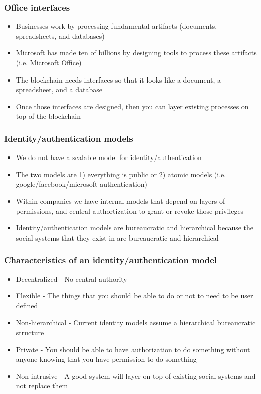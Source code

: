 \documentclass{beamer}
\begin{document}
\begin{frame}
  \frametitle{Office interfaces}
  \begin{itemize}
    \item Businesses work by processing fundamental artifacts
      (documents, spreadsheets, and databases)
    \item Microsoft has made ten of billions by designing tools to
      process these artifacts (i.e. Microsoft Office)
    \item The blockchain needs interfaces so that it looks like a
      document, a spreadsheet, and a database
    \item Once those interfaces are designed, then you can layer
      existing processes on top of the blockchain
  \end{itemize}
\end{frame}
\begin{frame}
  \frametitle{Identity/authentication models}
  \begin{itemize}
  \item We do not have a scalable model for identity/authentication
  \item The two models are 1) everything is public or 2) atomic models
    (i.e. google/facebook/microsoft authentication)
  \item Within companies we have internal models that depend on layers
    of permissions, and central authortization to grant or revoke
    those privileges
  \item Identity/authentication models are bureaucratic and
    hierarchical because the social systems that they exist in are
    bureaucratic and hierarchical
  \end{itemize}
\end{frame}
\begin{frame}
  \frametitle{Characteristics of an identity/authentication model}
  \begin{itemize}
  \item Decentralized - No central authority
    \item Flexible - The things that you should be able to do or not
      to need to be user defined
    \item Non-hierarchical - Current identity models assume a
      hierarchical bureaucratic structure
    \item Private - You should be able to have authorization to do
      something without anyone knowing that you have permission to do
      something
    \item Non-intrusive - A good system will layer on top of existing
      social systems and not replace them
  \end{itemize}
\end{frame}
\end{document}
